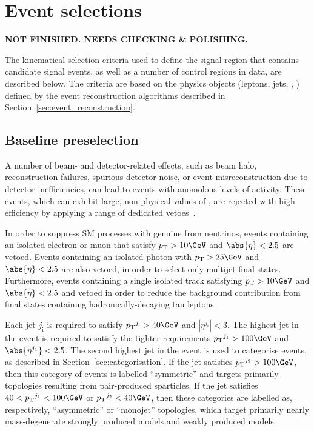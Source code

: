 \section{Event selections}
\label{sec:event_selection}

{\bf NOT FINISHED. NEEDS CHECKING \& POLISHING.}

The kinematical selection criteria used to define the signal region
that contains candidate signal events, as well as a number of control
regions in data, are described below. The criteria are based on the
physics objects (leptons, jets, \ETmiss, \etc) defined by the event
reconstruction algorithms described in
Section~\ref{sec:event_reconstruction}.

\subsection{Baseline preselection}
\label{sec:baseline}

A number of beam- and detector-related effects, such as beam halo,
reconstruction failures, spurious detector noise, or event
misreconstruction due to detector inefficiencies, can lead to events
with anomolous levels of activity. These events, which can exhibit
large, non-physical values of \ETmiss, are rejected with high
efficiency by applying a range of dedicated
vetoes~\cite{1748-0221-5-03-T03014, CMS-NOTE-2010-012, cms-met}.

In order to suppress SM processes with genuine \ETmiss from neutrinos,
events containing an isolated electron or muon that satisfy $\Pt >
10\GeV$ and $\abs{\eta} < 2.5$ are vetoed. Events containing an
isolated photon with $\Pt > 25\GeV$ and $\abs{\eta} < 2.5$ are also
vetoed, in order to select only multijet final states. Furthermore,
events containing a single isolated track satisfying $\Pt > 10\GeV$
and $\abs{\eta} < 2.5$ and vetoed in order to reduce the background
contribution from final states containing hadronically-decaying tau
leptons.

Each jet $j_\text{i}$ is required to satisfy $\Pt^{j_\text{i}} >
40\GeV$ and $|\eta^{j_\text{i}}| < 3$. The highest \Pt jet in the
event is required to satisfy the tighter requirements
$\Pt^{j_\text{1}} > 100\GeV$ and $\abs{\eta^{j_\text{1}}} < 2.5$. The
second highest \Pt jet in the event is used to categorise events, as
described in Section~\ref{sec:categorisation}. If the jet satisfies
$\Pt^{j_\text{2}} > 100\GeV$, then this category of events is labelled
``symmetric'' and targets primarily topologies resulting from
pair-produced sparticles. If the jet satisfies $40 < \Pt^{j_\text{1}}
< 100\GeV$ or $\Pt^{j_\text{2}} < 40\GeV$, then these categories are
labelled as, respectively, ``asymmetric'' or ``monojet'' topologies,
which target primarily nearly mass-degenerate strongly produced models
and weakly produced models.


